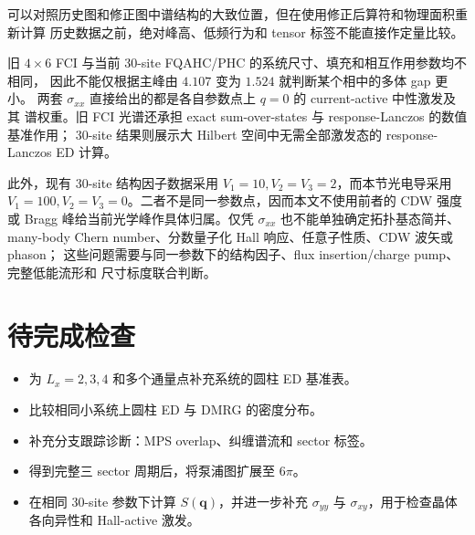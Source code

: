 \documentclass[11pt]{article}
\begin{document}
可以对照历史图和修正图中谱结构的大致位置，但在使用修正后算符和物理面积重新计算
历史数据之前，绝对峰高、低频行为和 tensor 标签不能直接作定量比较。

旧 \(4\times6\) FCI 与当前 30-site FQAHC/PHC 的系统尺寸、填充和相互作用参数均不相同，
因此不能仅根据主峰由 \(4.107\) 变为 \(1.524\) 就判断某个相中的多体 gap 更小。
两套 \(\sigma_{xx}\) 直接给出的都是各自参数点上 \(q=0\) 的 current-active 中性激发及其
谱权重。旧 FCI 光谱还承担 exact sum-over-states 与 response-Lanczos 的数值基准作用；
30-site 结果则展示大 Hilbert 空间中无需全部激发态的 response-Lanczos ED 计算。

此外，现有 30-site 结构因子数据采用 \(V_1=10,V_2=V_3=2\)，而本节光电导采用
\(V_1=100,V_2=V_3=0\)。二者不是同一参数点，因而本文不使用前者的 CDW 强度或
Bragg 峰给当前光学峰作具体归属。仅凭 \(\sigma_{xx}\) 也不能单独确定拓扑基态简并、
many-body Chern number、分数量子化 Hall 响应、任意子性质、CDW 波矢或 phason；
这些问题需要与同一参数下的结构因子、flux insertion/charge pump、完整低能流形和
尺寸标度联合判断。

\section{待完成检查}

\begin{itemize}
  \item 为 \(L_x=2,3,4\) 和多个通量点补充系统的圆柱 ED 基准表。
  \item 比较相同小系统上圆柱 ED 与 DMRG 的密度分布。
  \item 补充分支跟踪诊断：MPS overlap、纠缠谱流和 sector 标签。
  \item 得到完整三 sector 周期后，将泵浦图扩展至 \(6\pi\)。
  \item 在相同 30-site 参数下计算 \(S(\mathbf q)\)，并进一步补充
  \(\sigma_{yy}\) 与 \(\sigma_{xy}\)，用于检查晶体各向异性和 Hall-active 激发。
\end{itemize}
\end{document}
